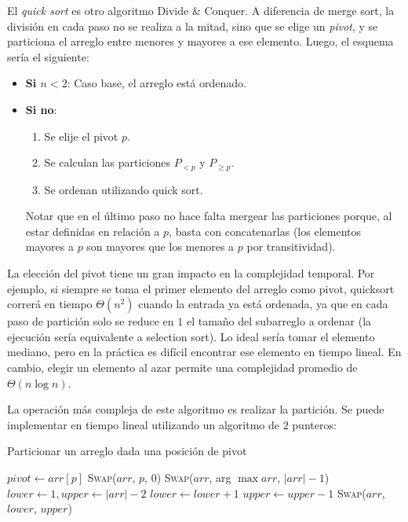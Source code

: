 \documentclass{article}
\newcommand{\BigTheta}[1]{{\Theta(#1)}}
\begin{document}
El \textit{quick sort} es otro algoritmo Divide \& Conquer. A diferencia de merge sort, la división en cada paso no se realiza a la mitad, sino que se elige un \textit{pivot}, y se particiona el arreglo entre menores y mayores a ese elemento. Luego, el esquema sería el siguiente:
\begin{itemize}
    \item \textbf{Si $n < 2$}: Caso base, el arreglo está ordenado.
    \item \textbf{Si no}:
          \begin{enumerate}
              \item Se elije el pivot $p$.
              \item Se calculan las particiones $P_{< p}$ y $P_{\geq p}$.
              \item Se ordenan utilizando quick sort.
          \end{enumerate}

          Notar que en el último paso no hace falta mergear las particiones porque, al estar definidas en relación a $p$, basta con concatenarlas (los elementos mayores a $p$ son mayores que los menores a $p$ por transitividad).

\end{itemize}

La elección del pivot tiene un gran impacto en la complejidad temporal. Por ejemplo, si siempre se toma el primer elemento del arreglo como pivot, quicksort correrá en tiempo $\BigTheta{n^2}$ cuando la entrada ya está ordenada, ya que en cada paso de partición solo se reduce en $1$ el tamaño del subarreglo a ordenar (la ejecución sería equivalente a selection sort). Lo ideal sería tomar el elemento mediano, pero en la práctica es difícil encontrar ese elemento en tiempo lineal. En cambio, elegir un elemento al azar permite una complejidad promedio de $\BigTheta{n\log{n}}$.

La operación más compleja de este algoritmo es realizar la partición. Se puede implementar en tiempo lineal utilizando un algoritmo de $2$ punteros:

\begin{algorithm}[H]
    \caption*{Particionar un arreglo dada una posición de pivot}
    \begin{algorithmic}
        \State $pivot \gets arr[p]$
        \State \textsc{Swap}($arr$, $p$, $0$)
        \State \textsc{Swap}($arr$, arg $\max{arr}$, $|arr| - 1$)
        \State $lower \gets 1, upper \gets |arr| - 2$
        \State $lower \gets lower + 1$
        \EndWhile
        \State $upper \gets upper - 1$
        \EndWhile
        \State \textsc{Swap}($arr$, $lower$, $upper$)
        \EndIf
        \EndWhile
        \EndFunction
    \end{algorithmic}
\end{algorithm}
\end{document}
